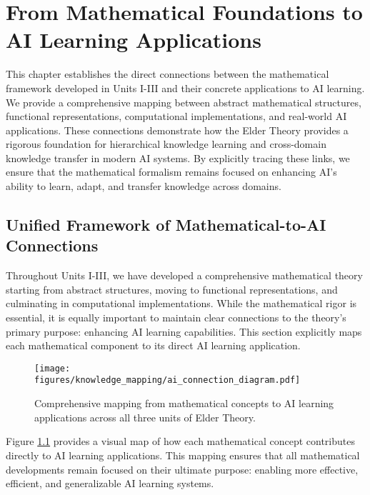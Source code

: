 \chapter{From Mathematical Foundations to AI Learning Applications}

\begin{tcolorbox}[colback=blue!5!white,colframe=blue!75!black,title=\textit{Chapter Summary}]
This chapter establishes the direct connections between the mathematical framework developed in Units I-III and their concrete applications to AI learning. We provide a comprehensive mapping between abstract mathematical structures, functional representations, computational implementations, and real-world AI applications. These connections demonstrate how the Elder Theory provides a rigorous foundation for hierarchical knowledge learning and cross-domain knowledge transfer in modern AI systems. By explicitly tracing these links, we ensure that the mathematical formalism remains focused on enhancing AI's ability to learn, adapt, and transfer knowledge across domains.
\end{tcolorbox}

\section{Unified Framework of Mathematical-to-AI Connections}

Throughout Units I-III, we have developed a comprehensive mathematical theory starting from abstract structures, moving to functional representations, and culminating in computational implementations. While the mathematical rigor is essential, it is equally important to maintain clear connections to the theory's primary purpose: enhancing AI learning capabilities. This section explicitly maps each mathematical component to its direct AI learning application.

\begin{figure}[h]
\centering
\texttt{[image: figures/knowledge\_mapping/ai\_connection\_diagram.pdf]}
\caption{Comprehensive mapping from mathematical concepts to AI learning applications across all three units of Elder Theory.}
\label{fig:ai_connection_diagram}
\end{figure}

Figure \ref{fig:ai_connection_diagram} provides a visual map of how each mathematical concept contributes directly to AI learning applications. This mapping ensures that all mathematical developments remain focused on their ultimate purpose: enabling more effective, efficient, and generalizable AI learning systems.

